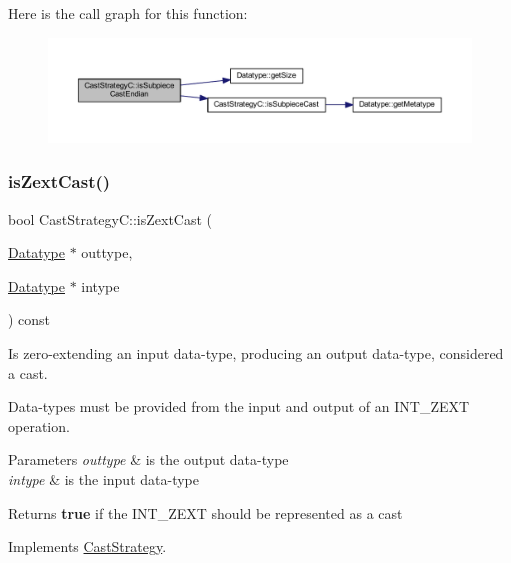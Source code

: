 Here is the call graph for this function\+:
\nopagebreak
\begin{figure}[H]
\begin{center}
\leavevmode
\includegraphics[width=350pt]{class_cast_strategy_c_a9fbcb64309ac27837a8da7aa76a6f1f6_cgraph}
\end{center}
\end{figure}
\mbox{\label{class_cast_strategy_c_a5c4b61d624a78a2e6f16bf2902e5b8e6}} 
\subsubsection{\texorpdfstring{isZextCast()}{isZextCast()}}
{\footnotesize\ttfamily bool Cast\+Strategy\+C\+::is\+Zext\+Cast (\begin{DoxyParamCaption}\item[{\mbox{\hyperlink{class_datatype}{Datatype}} $\ast$}]{outtype,  }\item[{\mbox{\hyperlink{class_datatype}{Datatype}} $\ast$}]{intype }\end{DoxyParamCaption}) const\hspace{0.3cm}{\ttfamily [virtual]}}



Is zero-\/extending an input data-\/type, producing an output data-\/type, considered a cast. 

Data-\/types must be provided from the input and output of an I\+N\+T\+\_\+\+Z\+E\+XT operation. 
\begin{DoxyParams}{Parameters}
{\em outtype} & is the output data-\/type \\
\hline
{\em intype} & is the input data-\/type \\
\hline
\end{DoxyParams}
\begin{DoxyReturn}{Returns}
{\bfseries{true}} if the I\+N\+T\+\_\+\+Z\+E\+XT should be represented as a cast 
\end{DoxyReturn}


Implements \mbox{\hyperlink{class_cast_strategy_a472229904419d83774345e569cef92d2}{Cast\+Strategy}}.



